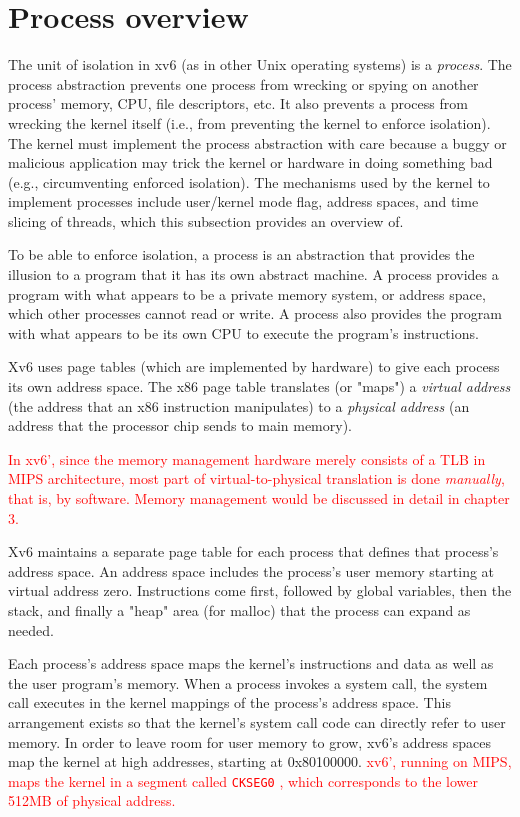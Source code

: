 \documentclass{report}
\begin{document}
	\section{Process overview}
	The unit of isolation in xv6 (as in other Unix operating systems) is a \emph{process}.
	The process abstraction prevents one process from wrecking or spying on another 
	process' memory, CPU, file descriptors, etc. It also prevents a process from wrecking the
	kernel itself (i.e., from preventing the kernel to enforce isolation). The kernel must
	implement the process abstraction with care because a buggy or malicious application
	may trick the kernel or hardware in doing something bad (e.g., circumventing enforced
	isolation). The mechanisms used by the kernel to implement processes include 
	user/kernel mode flag, address spaces, and time slicing of threads, which this subsection
	provides an overview of.
	
	To be able to enforce isolation, a process is an abstraction that provides the 
	illusion to a program that it has its own abstract machine. A process provides a program
	with what appears to be a private memory system, or address space, which other
	processes cannot read or write. A process also provides the program with what 
	appears to be its own CPU to execute the program's instructions.
	
	Xv6 uses page tables (which are implemented by hardware) to give each process
	its own address space. The x86 page table translates (or "maps") a \emph{virtual address}
	(the address that an x86 instruction manipulates) to a \emph{physical address} (an address
	that the processor chip sends to main memory).
	
	\textcolor{red}{
		In xv6', since the memory management hardware merely consists of a TLB in MIPS
		architecture, most part of virtual-to-physical translation is done \emph{manually},
		that is, by software.  Memory management would be discussed in detail in chapter 3.
	}
	
	Xv6 maintains a separate page table for each process that defines that process's
	address space. An address space includes the process's
	user memory starting at virtual address zero. Instructions come first, followed by global 
	variables, then the stack, and finally a "heap" area (for malloc) that the process can
	expand as needed.
	
	Each process's address space maps the kernel's instructions and data as well as the
	user program's memory. When a process invokes a system call, the system call executes 
	in the kernel mappings of the process's address space. This arrangement exists
	so that the kernel's system call code can directly refer to user memory. In order to
	leave room for user memory to grow, xv6's address spaces map the kernel at high 
	addresses, starting at 0x80100000.  \textcolor{red}{
		xv6', running on MIPS, maps the kernel in a segment called \texttt{CKSEG0}
		, which
		corresponds to the lower 512MB of physical address.
	}
	
\end{document}
